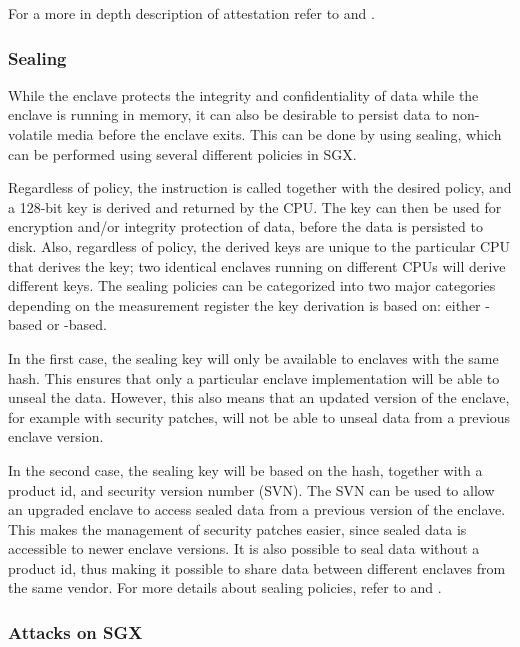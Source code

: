 For a more in depth description of attestation refer to \cite{anati:2013} and \cite{intel64b}.

\subsubsection{Sealing}

While the enclave protects the integrity and confidentiality of data while the enclave is running in memory, it can also be desirable to persist data to non-volatile media before the enclave exits.
This can be done by using sealing, which can be performed using several different policies in SGX.

Regardless of policy, the \sgxgetkey{} instruction is called together with the desired policy, and a 128-bit key is derived and returned by the CPU.
The key can then be used for encryption and/or integrity protection of data, before the data is persisted to disk.
Also, regardless of policy, the derived keys are unique to the particular CPU that derives the key; two identical enclaves running on different CPUs will derive different keys.
The sealing policies can be categorized into two major categories depending on the measurement register the key derivation is based on: either \sgxmrenclave{}-based or \sgxmrsigner{}-based.

In the first case, the sealing key will only be available to enclaves with the same \sgxmrenclave{} hash.
This ensures that only a particular enclave implementation will be able to unseal the data.
However, this also means that an updated version of the enclave, for example with security patches, will not be able to unseal data from a previous enclave version.

In the second case, the sealing key will be based on the \sgxmrsigner{} hash, together with a product id, and security version number (SVN).
The SVN can be used to allow an upgraded enclave to access sealed data from a previous version of the enclave.
This makes the management of security patches easier, since sealed data is accessible to newer enclave versions.
It is also possible to seal data without a product id, thus making it possible to share data between different enclaves from the same vendor.
For more details about sealing policies, refer to \cite{anati:2013} and \cite{intel64b}.

\subsubsection{Attacks on SGX}


